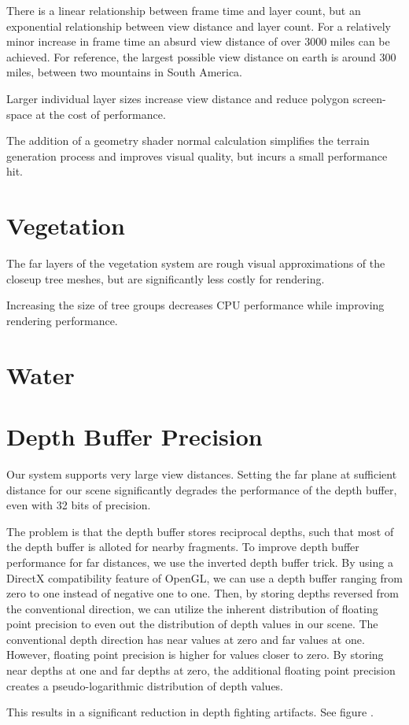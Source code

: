 There is a linear relationship between frame time and layer count, but an exponential relationship between view distance and layer count.
For a relatively minor increase in frame time an absurd view distance of over 3000 miles can be achieved.
For reference, the largest possible view distance on earth is around 300 miles, between two mountains in South America. \cite{viewdistancemaxearth}

Larger individual layer sizes increase view distance and reduce polygon screen-space at the cost of performance.

The addition of a geometry shader normal calculation simplifies the terrain generation process and improves visual quality, but incurs a small performance hit.


\section{Vegetation}

The far layers of the vegetation system are rough visual approximations of the closeup tree meshes, but are significantly less costly for rendering.

Increasing the size of tree groups decreases CPU performance while improving rendering performance.


\section{Water}


\section{Depth Buffer Precision}

Our system supports very large view distances.
Setting the far plane at sufficient distance for our scene significantly degrades the performance of the depth buffer, even with 32 bits of precision.

The problem is that the depth buffer stores reciprocal depths, such that most of the depth buffer is alloted for nearby fragments.
To improve depth buffer performance for far distances, we use the inverted depth buffer trick.
By using a DirectX compatibility feature of OpenGL, we can use a depth buffer ranging from zero to one instead of negative one to one.
Then, by storing depths reversed from the conventional direction, we can utilize the inherent distribution of floating point precision to even out the distribution of depth values in our scene.
The conventional depth direction has near values at zero and far values at one.
However, floating point precision is higher for values closer to zero.
By storing near depths at one and far depths at zero, the additional floating point precision creates a pseudo-logarithmic distribution of depth values.

This results in a significant reduction in depth fighting artifacts.
See figure .

